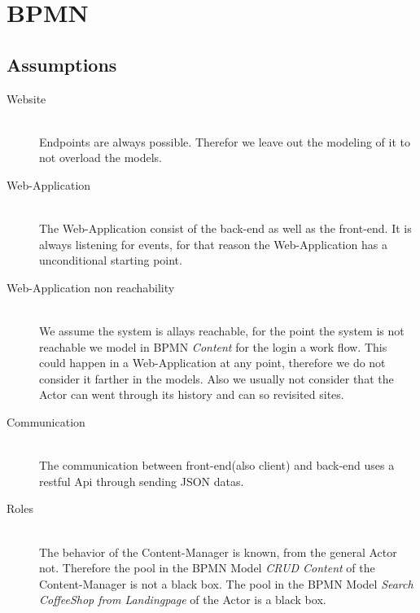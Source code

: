 \newpage
\section{BPMN}

\subsection{Assumptions}
\begin{description}
\item[Website]\hfill \\
Endpoints are always possible. Therefor we leave out the modeling of it to not overload the models.
\item[Web-Application]\hfill \\ 
The Web-Application consist of the back-end as well as the front-end.
It is always listening for events, for that reason the Web-Application has a unconditional starting point.
\item[Web-Application non reachability]\hfill \\
We assume the system is allays reachable, for the point the system is not reachable we model in BPMN \textit{Content} for the login a work flow.
This could happen in a Web-Application at any point, therefore we do not consider it farther in the models. Also we usually not consider that the Actor can went through its history and can so revisited sites.
\item[Communication]\hfill \\ The communication between front-end(also client) and back-end uses a restful Api through sending JSON datas. 
\item[Roles]\hfill \\ 
The behavior of the Content-Manager is known, from the general Actor not.
Therefore the pool in the BPMN Model \textit{CRUD Content} of the Content-Manager is not a black box. The pool in the BPMN Model \textit{Search  CoffeeShop from Landingpage} of the Actor is a black box.
\end{description}


\newpage
